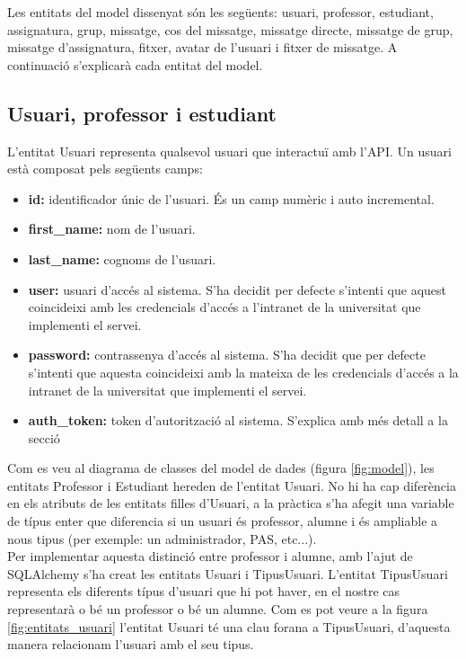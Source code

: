 Les entitats del model dissenyat són les següents: usuari, professor, estudiant, assignatura, grup, missatge, cos del missatge, missatge directe, missatge de grup, missatge d'assignatura, fitxer, avatar de l'usuari i fitxer de missatge. A continuació s'explicarà cada entitat del model.

	\subsection{Usuari, professor i estudiant} \label{user_teacher_student}

	L'entitat Usuari representa qualsevol usuari que interactuï amb l'\ac{API}. Un usuari està composat pels següents camps: 
	\begin{itemize}
		\item \textbf{id:} identificador únic de l'usuari. És un camp numèric i auto incremental.
		\item \textbf{first\_name:} nom de l'usuari.
		\item \textbf{last\_name:} cognoms de l'usuari.
		\item \textbf{user:} usuari d'accés al sistema. S'ha decidit per defecte s'intenti que aquest coincideixi amb les credencials d'accés a l'intranet de la universitat que implementi el servei.
		\item \textbf{password:} contrassenya d'accés al sistema. S'ha decidit que per defecte s'intenti que aquesta coincideixi amb la mateixa de les credencials d'accés a la intranet de la universitat que implementi el servei. 
		\item \textbf{auth\_token:} token d'autorització al sistema. S'explica amb més detall a la secció %
	\end{itemize}
	
	Com es veu al diagrama de classes del model de dades (figura \ref{fig:model}), les entitats Professor i Estudiant hereden de l'entitat Usuari. No hi ha cap diferència en els atributs de les entitats filles d'Usuari, a la pràctica s'ha afegit una variable de típus enter que diferencia si un usuari és professor, alumne i és ampliable a nous tipus (per exemple: un administrador, \ac{PAS}, etc...). \\
	
	Per implementar aquesta distinció entre professor i alumne, amb l'ajut de SQLAlchemy s'ha creat les entitats Usuari i TipusUsuari. L'entitat TipusUsuari representa els diferents típus d'usuari que hi pot haver, en el nostre cas  representarà o bé un professor o bé un alumne. Com es pot veure a la figura \ref{fig:entitats_usuari} l'entitat Usuari té una clau forana a TipusUsuari, d'aquesta manera relacionam l'usuari amb el seu tipus. \\
	
